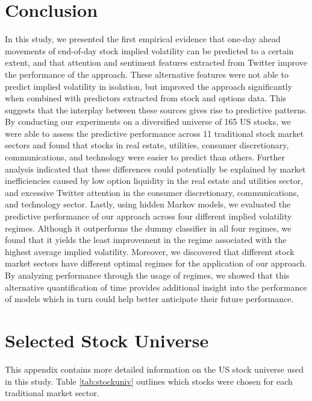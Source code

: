 \documentclass[preprint,1p, times,authoryear]{elsarticle}
\begin{document}
\section{Conclusion}
In this study, we presented the first empirical evidence that one-day ahead movements of end-of-day stock implied volatility can be predicted to a certain extent, and that attention and sentiment features extracted from Twitter improve the performance of the approach. These alternative features were not able to predict implied volatility in isolation, but improved the approach significantly when combined with predictors extracted from stock and options data. This suggests that the interplay between these sources gives rise to predictive patterns. By conducting our experiments on a diversified universe of 165 US stocks, we were able to assess the predictive performance across 11 traditional stock market sectors and found that stocks in real estate, utilities, consumer discretionary, communications, and technology were easier to predict than others. Further analysis indicated that these differences could potentially be explained by market inefficiencies caused by low option liquidity in the real estate and utilities sector, and excessive Twitter attention in the consumer discretionary, communications, and technology sector. Lastly, using hidden Markov models, we evaluated the predictive performance of our approach across four different implied volatility regimes. Although it outperforms the dummy classifier in all four regimes, we found that it yields the least improvement in the regime associated with the highest average implied volatility. Moreover, we discovered that different stock market sectors have different optimal regimes for the application of our approach. By analyzing performance through the usage of regimes, we showed that this alternative quantification of time provides additional insight into the performance of models which in turn could help better anticipate their future performance.

\appendix

\clearpage
\section{Selected Stock Universe}
\label{appA}

This appendix contains more detailed information on the US stock universe used in this study. Table \ref{tab:stockuniv} outlines which stocks were chosen for each traditional market sector.
\end{document}
